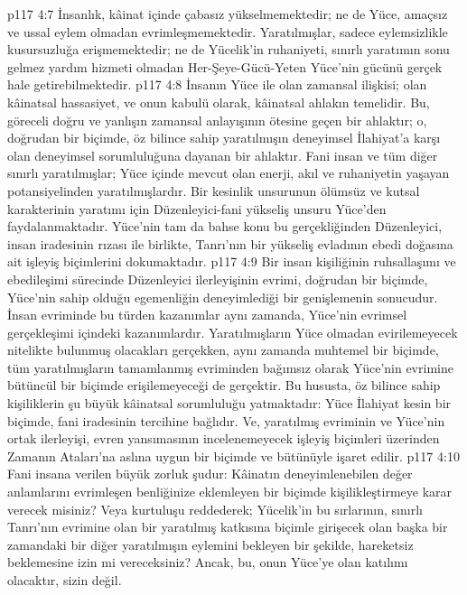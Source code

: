 \vs p117 4:7 İnsanlık, kâinat içinde çabasız yükselmemektedir; ne de Yüce, amaçsız ve ussal eylem olmadan evrimleşmemektedir. Yaratılmışlar, sadece eylemsizlikle kusursuzluğa erişmemektedir; ne de Yücelik’in ruhaniyeti, sınırlı yaratımın sonu gelmez yardım hizmeti olmadan Her\hyp{}Şeye\hyp{}Gücü\hyp{}Yeten Yüce’nin gücünü gerçek hale getirebilmektedir.
\vs p117 4:8 İnsanın Yüce ile olan zamansal ilişkisi;  olan kâinatsal hassasiyet, ve onun kabulü olarak, kâinatsal ahlakın temelidir. Bu, göreceli doğru ve yanlışın zamansal anlayışının ötesine geçen bir ahlaktır; o, doğrudan bir biçimde, öz bilince sahip yaratılmışın deneyimsel İlahiyat’a karşı olan deneyimsel sorumluluğuna dayanan bir ahlaktır. Fani insan ve tüm diğer sınırlı yaratılmışlar; Yüce içinde mevcut olan enerji, akıl ve ruhaniyetin yaşayan potansiyelinden yaratılmışlardır. Bir kesinlik unsurunun ölümsüz ve kutsal karakterinin yaratımı için Düzenleyici\hyp{}fani yükseliş unsuru Yüce’den faydalanmaktadır. Yüce’nin tam da bahse konu bu gerçekliğinden Düzenleyici, insan iradesinin rızası ile birlikte, Tanrı’nın bir yükseliş evladının ebedi doğasına ait işleyiş biçimlerini dokumaktadır.
\vs p117 4:9 Bir insan kişiliğinin ruhsallaşımı ve ebedileşimi sürecinde Düzenleyici ilerleyişinin evrimi, doğrudan bir biçimde, Yüce’nin sahip olduğu egemenliğin deneyimlediği bir genişlemenin sonucudur. İnsan evriminde bu türden kazanımlar aynı zamanda, Yüce’nin evrimsel gerçekleşimi içindeki kazanımlardır. Yaratılmışların Yüce olmadan evirilemeyecek nitelikte bulunmuş olacakları gerçekken, aynı zamanda muhtemel bir biçimde, tüm yaratılmışların tamamlanmış evriminden bağımsız olarak Yüce’nin evrimine bütüncül bir biçimde erişilemeyeceği de gerçektir. Bu hususta, öz bilince sahip kişiliklerin şu büyük kâinatsal sorumluluğu yatmaktadır: Yüce İlahiyat kesin bir biçimde, fani iradesinin tercihine bağlıdır. Ve, yaratılmış evriminin ve Yüce’nin ortak ilerleyişi, evren yansımasının incelenemeyecek işleyiş biçimleri üzerinden Zamanın Ataları’na aslına uygun bir biçimde ve bütünüyle işaret edilir.
\vs p117 4:10 Fani insana verilen büyük zorluk şudur: Kâinatın deneyimlenebilen değer anlamlarını evrimleşen benliğinize eklemleyen bir biçimde kişilikleştirmeye karar verecek misiniz? Veya kurtuluşu reddederek; Yücelik’in bu sırlarının, sınırlı Tanrı’nın evrimine olan bir yaratılmış katkısına  biçimle girişecek olan başka bir zamandaki bir diğer yaratılmışın eylemini bekleyen bir şekilde, hareketsiz beklemesine izin mi vereceksiniz? Ancak, bu, onun Yüce’ye olan katılımı olacaktır, sizin değil.
